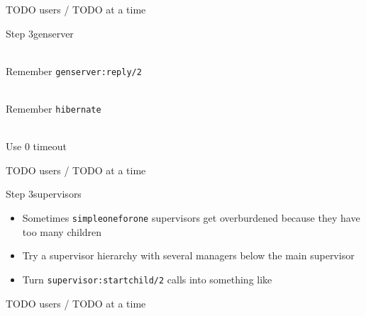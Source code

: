 \documentclass[utf8]{beamer}
\begin{document}
\begin{frame}
TODO users / TODO at a time
\end{frame}

\begin{frame}{Step 3}{gen\textunderscore server}
	\begin{description}
		\item<+->[Call Timeouts]\ \\
			Remember \texttt{gen\textunderscore server:reply/2}
		\item<+->[Memory Footprint]\ \\
			Remember \texttt{hibernate}
		\item<+->[Long \texttt{init/1}]\ \\
			Use $0$ timeout
	\end{description}
\end{frame}

\begin{frame}
TODO users / TODO at a time
\end{frame}

\lstset{language=erlang}

\begin{frame}{Step 3}{supervisors}
	\begin{itemize}
		\item Sometimes \texttt{simple\textunderscore one\textunderscore for\textunderscore one} supervisors get \alert{overburdened} because they have too many children
		\item Try a supervisor hierarchy with several managers below the main supervisor
		\item Turn \texttt{supervisor:start\textunderscore child/2} calls into something like
		\startchild
	\end{itemize}
\end{frame}

\begin{frame}
TODO users / TODO at a time
\end{frame}
\end{document}
